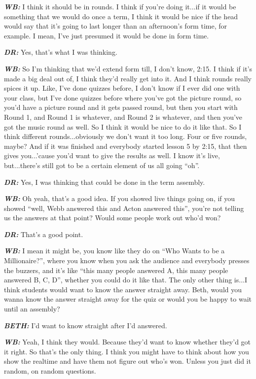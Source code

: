 \textit{\textbf{WB:}} I think it should be in rounds. I think if you're doing it...if it would be something that we would do once a term, I think it would be nice if the head would say that it's going to last longer than an afternoon's form time, for example. I mean, I've just presumed it would be done in form time.

\textit{\textbf{DR:}} Yes, that's what I was thinking.

\textit{\textbf{WB:}} So I'm thinking that we'd extend form till, I don't know, 2:15. I think if it's made a big deal out of, I think they'd really get into it. And I think rounds really spices it up. Like, I've done quizzes before, I don't know if I ever did one with your class, but I've done quizzes before where you've got the picture round, so you'd have a picture round and it gets passed round, but then you start with Round 1, and Round 1 is whatever, and Round 2 is whatever, and then you've got the music round as well. So I think it would be nice to do it like that. So I think different rounds...obviously we don't want it too long. Four or five rounds, maybe? And if it was finished and everybody started lesson 5 by 2:15, that then gives you...'cause you'd want to give the results as well. I know it's live, but...there's still got to be a certain element of us all going ``oh''.

\textit{\textbf{DR:}} Yes, I was thinking that could be done in the term assembly.

\textit{\textbf{WB:}} Oh yeah, that's a good idea. If you showed live things going on, if you showed ``well, Webb answered this and Acton answered this'', you're not telling us the answers at that point? Would some people work out who'd won?

\textit{\textbf{DR:}} That's a good point.

\textit{\textbf{WB:}} I mean it might be, you know like they do on ``Who Wants to be a Millionaire?'', where you know when you ask the audience and everybody presses the buzzers, and it's like ``this many people answered A, this many people answered B, C, D'', whether you could do it like that. The only other thing is...I think students would want to know the answer straight away. Beth, would you wanna know the answer straight away for the quiz or would you be happy to wait until an assembly?

\textit{\textbf{BETH:}} I'd want to know straight after I'd answered.

\textit{\textbf{WB:}} Yeah, I think they would. Because they'd want to know whether they'd got it right. So that's the only thing. I think you might have to think about how you show the realtime and have them not figure out who's won. Unless you just did it random, on random questions.

